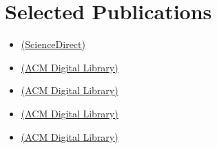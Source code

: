 \documentclass[11pt,a4paper,unicode]{moderncv}
\begin{document}
\section{Selected Publications}
\begin{itemize}[leftmargin=1cm,itemsep=0.3ex]
    \small
    \item {}
    \href{https://www.sciencedirect.com/science/article/pii/S0266352X21002822}{(ScienceDirect)}
    \item {}
        \href{https://dl.acm.org/doi/10.1145/3450626.3459781}{(ACM Digital Library)}
    \item {}
    \href{https://dl.acm.org/doi/10.1145/3355089.3356537}{(ACM Digital Library)}
    \item {}
    \href{https://dl.acm.org/doi/10.1145/3340258}{(ACM Digital Library)} 
    \item {}
    \href{https://dl.acm.org/doi/10.1145/3340259}{(ACM Digital Library)}
\end{itemize}
\end{document}
